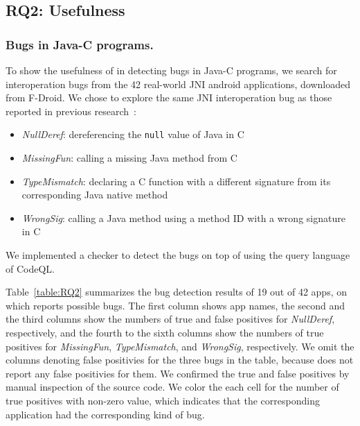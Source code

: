 

\subsection{RQ2: Usefulness}

\subsubsection{Bugs in Java-C programs.}
To show the usefulness of \ours in detecting bugs in Java-C programs,
we search for interoperation bugs from the 42 real-world JNI android applications, downloaded from F-Droid.
We chose to explore the same JNI interoperation bug as those
reported in previous research~\cite{LeeASE20, ILEA}:
\begin{itemize}
  \item {\it NullDeref}: dereferencing the {\tt null} value of Java in C
  \item {\it MissingFun}: calling a missing Java method from C
  \item {\it TypeMismatch}: declaring a C function with a different signature
    from its corresponding Java native method
  \item {\it WrongSig}: calling a Java method using a method ID with a
    wrong signature in C
\end{itemize}
We implemented a checker to detect the bugs on top of \ours using the
query language of CodeQL. 

Table~\ref{table:RQ2} summarizes the bug detection results of 19 out of 42
apps, on which \ours reports possible bugs.  The first
column shows app names, the second and the third columns show the
numbers of true and false positives for {\it NullDeref}, respectively, and
the fourth to the sixth columns show the numbers of true positives for {\it
MissingFun}, {\it TypeMismatch}, and {\it WrongSig}, respectively.
We omit the columns denoting false positivies for the three bugs in the table,
because \ours does not report any false positivies for them.
We confirmed the true and false positives by manual inspection of the source code.
We color the each cell for the number of true positives with non-zero value,
which indicates that the corresponding application had the corresponding kind of bug.


